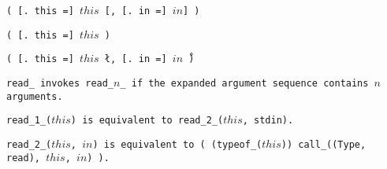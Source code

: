
\s\s\s\tt{(} [\tt{. this =}] $this$ [\tt{,}
[\tt{. in =}] $in$] \tt{)}

\s\tt{(}   [\tt{. this =}] $this$ \tt{)}

\s\tt{(}   [\tt{. this =}] $this$ \l\tt{,}
[\tt{. in =}] $in$\r\ \tt{)}


\tt{read_} invokes \tt{read_}$n$\_ if the expanded
argument sequence contains $n$ arguments.

\tt{read_1_(}$this$\tt{)} is equivalent to \tt{read_2_(}$this$\tt{, stdin)}.

\tt{read_2_(}$this$\tt{,} $in$\tt{)} is equivalent to
\tt{( (typeof_(}$this$\tt{)) call_((Type, read),} $this$\tt{,} $in$\tt{) )}.

